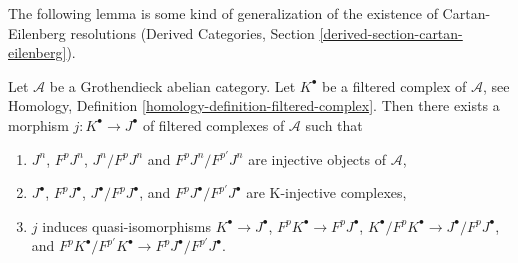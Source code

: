 \noindent
The following lemma is some kind of generalization of
the existence of Cartan-Eilenberg resolutions
(Derived Categories, Section \ref{derived-section-cartan-eilenberg}).

\begin{lemma}
\label{lemma-K-injective-embedding-filtration}
Let $\mathcal{A}$ be a Grothendieck abelian category.
Let $K^\bullet$ be a filtered complex of $\mathcal{A}$, see
Homology, Definition \ref{homology-definition-filtered-complex}.
Then there exists a morphism $j : K^\bullet \to J^\bullet$
of filtered complexes of $\mathcal{A}$ such that
\begin{enumerate}
\item $J^n$, $F^pJ^n$, $J^n/F^pJ^n$ and $F^pJ^n/F^{p'}J^n$ are injective
objects of $\mathcal{A}$,
\item $J^\bullet$, $F^pJ^\bullet$, $J^\bullet/F^pJ^\bullet$, and
$F^pJ^\bullet/F^{p'}J^\bullet$ are K-injective complexes,
\item $j$ induces quasi-isomorphisms
$K^\bullet \to J^\bullet$,
$F^pK^\bullet \to F^pJ^\bullet$,
$K^\bullet/F^pK^\bullet \to J^\bullet/F^pJ^\bullet$, and
$F^pK^\bullet/F^{p'}K^\bullet \to F^pJ^\bullet/F^{p'}J^\bullet$.
\end{enumerate}
\end{lemma}

